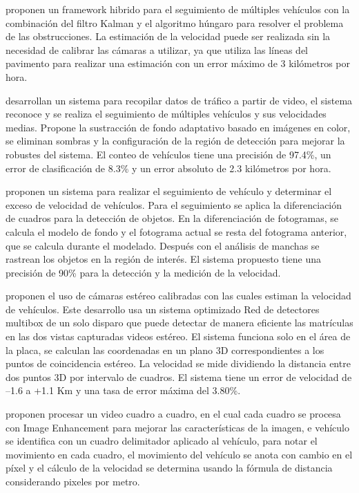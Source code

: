 \citeauthor{anil2015Real} proponen un framework hibrido para el seguimiento de múltiples vehículos con la combinación del filtro Kalman y el algoritmo húngaro para resolver el problema de las obstrucciones. La estimación de la velocidad puede ser realizada sin la necesidad de calibrar las cámaras a utilizar, ya que utiliza las líneas del pavimento para realizar una estimación con un error máximo de 3 kilómetros por hora.


\citeauthor{li2014Video} desarrollan un sistema para recopilar datos de tráfico a partir de video, el sistema reconoce y se realiza el seguimiento de múltiples vehículos y sus velocidades medias. Propone la sustracción de fondo adaptativo basado en imágenes en color, se eliminan sombras y la configuración de la región de detección para mejorar la robustes del sistema. El conteo de vehículos tiene una precisión de 97.4\%, un error de clasificación de 8.3\% y un error absoluto de 2.3 kilómetros por hora.


\citeauthor{khan2019Multiple} proponen un sistema para realizar el seguimiento de vehículo y determinar el exceso de velocidad de vehículos. Para el seguimiento se aplica la diferenciación de cuadros para la detección de objetos. En la diferenciación de fotogramas, se calcula el modelo de fondo y el fotograma actual se resta del fotograma anterior, que se calcula durante el modelado. Después con el análisis de manchas se rastrean los objetos en la región de interés. El sistema propuesto tiene una precisión de 90\% para la detección y la medición de la velocidad.


\citeauthor{yang2019Vehicle} proponen el uso de cámaras estéreo calibradas con las cuales estiman la velocidad de vehículos. Este desarrollo usa un sistema optimizado Red de detectores multibox de un solo disparo que puede detectar de manera eficiente las matrículas en las dos vistas capturadas videos estéreo. El sistema funciona solo en el área de la placa, se calculan las coordenadas en un plano 3D correspondientes a los puntos de coincidencia estéreo. La velocidad se mide dividiendo la distancia entre dos puntos 3D por intervalo de cuadros. El sistema tiene un error de velocidad de –1.6 a +1.1 Km y una tasa de error máxima del 3.80\%.


\citeauthor{kamoji2020Image} proponen procesar un video cuadro a cuadro, en el cual cada cuadro se procesa con Image Enhancement para mejorar las características de la imagen, e vehículo se identifica con un cuadro delimitador aplicado al vehículo, para notar el movimiento en cada cuadro, el movimiento del vehículo se anota con cambio en el píxel y el cálculo de la velocidad se determina usando la fórmula de distancia considerando pixeles por metro.


